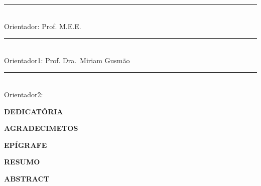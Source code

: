 \documentclass[12pt,a4paper,oneside,brazil]{abntex2}
\newcommand{\grauOrientador}{Prof. M.E.E.}
\newcommand{\grauBancaUm}{Prof. Dra.}
\newcommand{\bancaUm}{Miriam Gusmão}
\newcommand{\grauBancaDois}{}
\newcommand{\bancaDois}{}
\begin{document}
    \centering

    \vspace*{3cm}

    \begin{flushright}
    \rule{10cm}{0.4pt}\\
    \textnormal{Orientador: \grauOrientador \imprimirorientador}

    \vspace*{10mm}

    \rule{10cm}{0.4pt}\\
    \textnormal{Orientador1: \grauBancaUm \, \bancaUm}

    \vspace*{10mm}

    \rule{10cm}{0.4pt}\\
    \textnormal{Orientador2: \grauBancaDois \, \bancaDois}
    \end{flushright}

    \vspace*{6cm}

    \bfseries{\imprimirlocal}

    \bfseries{\imprimirdata}
\clearpage %

\centering
\ABNTEXchapterfont\bfseries{\textsc{\MakeUppercase{Dedicatória}}}\\
\vspace*{3cm}
\justifying
\normalfont
\lipsum[1-5]
\clearpage

\centering
\ABNTEXchapterfont\bfseries{\textsc{\MakeUppercase{Agradecimetos}}}\\
\vspace*{3cm}
\justifying
\normalfont
\lipsum[1]
\clearpage

\centering
\ABNTEXchapterfont\bfseries{\textsc{\MakeUppercase{Epígrafe}}}\\
\vspace*{3cm}
\justifying
\normalfont
\lipsum[1-3]
\clearpage

\centering
\ABNTEXchapterfont\bfseries{\textsc{\MakeUppercase{Resumo}}}\\
\vspace*{3cm}
\justifying
\normalfont
\lipsum[12-13]
\clearpage

\centering
\ABNTEXchapterfont\bfseries{\textsc{\MakeUppercase{Abstract}}}\\
\vspace*{3cm}
\justifying
\normalfont
\lipsum[7]
\clearpage
\end{document}
